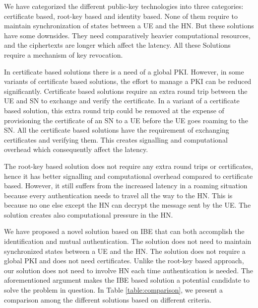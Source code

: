 \documentclass{llncs} %
\begin{document}
We have categorized the different public-key technologies into three categories: certificate based, root-key based and identity based. None of them require to maintain synchronization of states between a UE and the HN. But these solutions have some downsides. They need comparatively heavier computational resources, and the ciphertexts are longer which affect the latency. All these Solutions require a mechanism of key revocation.

In certificate based solutions there is a need of a global PKI. However, in some variants of certificate based solutions, the effort to manage a PKI can be reduced significantly. Certificate based solutions require an extra round trip between the UE and SN to exchange and verify the certificate. In a variant of a certificate based solution, this extra round trip could be removed at the expense of provisioning the certificate of an SN to a UE before the UE goes roaming to the SN. All the certificate based solutions have the requirement of exchanging certificates and verifying them. This creates signalling and computational overhead which consequently affect the latency. 

The root-key based solution does not require any extra round trips or certificates, hence it has better signalling and computational overhead compared to certificate based. However, it still suffers from the increased latency in a roaming situation because every authentication needs to travel all the way to the HN. This is because no one else except the HN can decrypt the message sent by the UE. The solution creates also computational pressure in the HN. 

We have proposed a novel solution based on IBE that can both accomplish the identification and mutual authentication. The solution does not need to maintain synchronized states between a UE and the HN. The solution does not require a global PKI and does not need certificates. Unlike the root-key based approach, our solution does not need to involve HN each time authentication is needed. The aforementioned argument makes the IBE based solution a potential candidate to solve the problem in question. In Table \ref{table:comparison}, we present a comparison among the different solutions based on different criteria.
\end{document}
